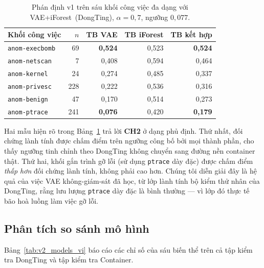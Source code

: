 \begin{table}[!t]
\centering
\caption{Phán định v1 trên sáu khối công việc đa dạng với
VAE+iForest~(DongTing), $\alpha=0{,}7$, ngưỡng $0{,}077$.}
\label{tab:diversity_vi}
\begin{tabular}{lrrrr}
\toprule
Khối công việc          & $n$ & TB VAE & TB iForest & TB kết hợp \\
\midrule
\texttt{anom-execbomb}  & 69  & \textbf{0,524} & 0,523 & \textbf{0,524} \\
\texttt{anom-netscan}   & 7   & 0,408          & 0,594 & 0,464          \\
\texttt{anom-kernel}    & 24  & 0,274          & 0,485 & 0,337          \\
\texttt{anom-privesc}   & 228 & 0,222          & 0,536 & 0,316          \\
\texttt{anom-benign}    & 47  & 0,170          & 0,514 & 0,273          \\
\texttt{anom-ptrace}    & 241 & \textbf{0,076} & 0,420 & \textbf{0,179} \\
\bottomrule
\end{tabular}
\end{table}

Hai mẫu hiện rõ trong Bảng~\ref{tab:diversity_vi} trả lời \textbf{CH2}
ở dạng phủ định. Thứ nhất, đối chứng lành tính được chấm điểm trên
ngưỡng công bố bởi mọi thành phần, cho thấy ngưỡng tinh chỉnh theo
DongTing không chuyển sang đường nền container thật. Thứ hai, khối
gắn trình gỡ lỗi (sử dụng \texttt{ptrace} dày đặc) được chấm điểm
\emph{thấp hơn} đối chứng lành tính, không phải cao hơn. Chúng tôi
diễn giải đây là hệ quả của việc VAE không-giám-sát đã học, từ lớp
lành tính bộ kiểm thử nhân của DongTing, rằng lưu lượng \texttt{ptrace}
dày đặc là bình thường --- vì lớp đó thực tế bão hoà luồng làm việc
gỡ lỗi.

\subsection{Phân tích so sánh mô hình}
\label{subsec:comparative_vi}
Bảng~\ref{tab:v2_models_vi} báo cáo các chỉ số của sáu biến thể trên
cả tập kiểm tra DongTing và tập kiểm tra Container.

